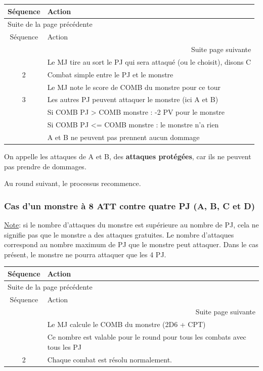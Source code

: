 \documentclass[a4paper, 11pt, twoside]{article}
\begin{document}
\begin{longtable}{c|l}
Séquence & Action\\
\hline
\endfirsthead
\multicolumn{2}{l}{Suite de la page précédente} \\
\hline

Séquence & Action \\

\hline
\endhead
\hline\multicolumn{2}{r}{Suite page suivante} \\
\endfoot
\endlastfoot
\hline
1 & Le MJ tire au sort le PJ qui sera attaqué (ou le choisit), disons  C\\
2 & Combat simple entre le PJ et le monstre\\
 & Le MJ note le score de COMB du monstre pour ce tour\\
3 & Les autres PJ peuvent attaquer le monstre (ici A et B)\\
 & Si COMB PJ > COMB monstre : -2 PV pour le monstre\\
 & Si COMB PJ <= COMB monstre : le monstre n'a rien\\
 & A et B ne peuvent pas prennent aucun dommage\\
\end{longtable}

On appelle les attaques de A et B, des \textbf{attaques protégées}, car ils ne peuvent pas prendre de dommages.

Au round suivant, le processus recommence.

\subsubsection{Cas d'un monstre à 8 ATT contre quatre PJ (A, B, C et D)}
\label{sec:org01a7daf}

\uline{Note}: si le nombre d'attaques du monstre est supérieure au nombre de PJ, cela ne signifie pas que le monstre a des attaques gratuites. Le nombre d'attaques correspond au nombre maximum de PJ que le monstre peut attaquer. Dans le cas présent, le monstre ne pourra attaquer que les 4 PJ.

\begin{longtable}{c|l}
Séquence & Action\\
\hline
\endfirsthead
\multicolumn{2}{l}{Suite de la page précédente} \\
\hline

Séquence & Action \\

\hline
\endhead
\hline\multicolumn{2}{r}{Suite page suivante} \\
\endfoot
\endlastfoot
\hline
1 & Le MJ calcule le COMB du monstre (2D6 + CPT)\\
 & Ce nombre  est valable pour le round pour tous les combats avec tous les PJ\\
2 & Chaque combat est résolu normalement.\\
\end{longtable}
\end{document}

